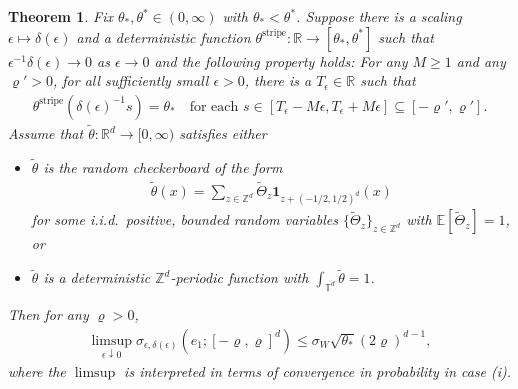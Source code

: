 \documentclass[10pt,a4paper]{amsart}
\newtheorem{theorem}{Theorem}
\begin{document}
	\begin{theorem} \label{T: general rare events} Fix $\theta_{*}, \theta^{*} \in (0,\infty)$ with $\theta_{*} < \theta^{*}$.  Suppose there is a scaling $\epsilon \mapsto \delta(\epsilon)$ and a  deterministic function $\theta^{\text{stripe}} : \mathbb{R} \to [\theta_{*},\theta^{*}]$ such that $\epsilon^{-1} \delta(\epsilon) \to 0$ as $\epsilon \to 0$ and the following property holds: For any $M \geq 1$ and any $\varrho' > 0$, for all sufficiently small $\epsilon > 0$, there is a $T_{\epsilon} \in \mathbb{R}$ such that 
		\begin{align} \label{E: stripe condition}
			\theta^{\text{stripe}}( \delta(\epsilon)^{-1} s ) = \theta_{*} \quad \text{for each} \, \, s \in [ T_{\epsilon} - M \epsilon, T_{\epsilon} + M \epsilon ] \subseteq [-\varrho', \varrho'].
		\end{align}
	Assume that $\tilde{\theta} : \mathbb{R}^{d} \to [0,\infty)$ satisfies either
		\begin{itemize}
			\item[(i)] $\tilde{\theta}$ is the random checkerboard of the form
				\begin{align*}
					\tilde{\theta}(x) = \sum_{ z \in \mathbb{Z}^{d} } \tilde{\Theta}_{z} \mathbf{1}_{z + (-1/2,1/2)^{d} }(x)
				\end{align*}
			for some i.i.d.\ positive, bounded random variables $\{ \tilde{\Theta}_{z} \}_{z \in \mathbb{Z}^{d}}$ with $\mathbb{E} [ \tilde{\Theta}_{z} ] = 1$, or 
			\item[(ii)] $\tilde{\theta}$ is a deterministic $\mathbb{Z}^{d}$-periodic function with $\int_{\mathbb{T}^{d}} \tilde{\theta} = 1$.
		\end{itemize}
	Then for any $\varrho > 0$,
		\begin{align*}
			\limsup_{ \epsilon \downarrow 0 } \sigma_{ \epsilon, \delta(\epsilon) } ( e_{1} ; [-\varrho,\varrho]^{d} ) \leq \sigma_{W} \sqrt{ \theta_{*} } (2\varrho)^{d-1},
		\end{align*}
	where the $\limsup$ is interpreted in terms of convergence in probability in case (i).
	\end{theorem}
\end{document}
